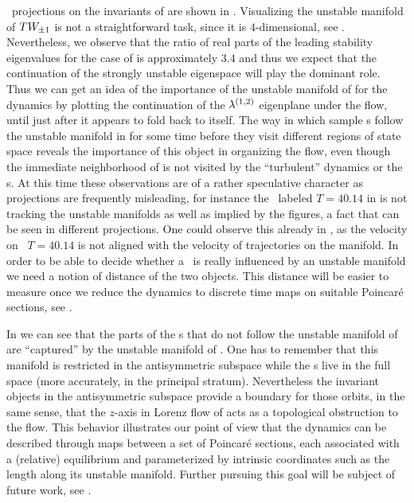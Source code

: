 \Statesp\ projections on the invariants of  are shown in
.
Visualizing the unstable manifold of $TW_{\pm1}$ is not a
straightforward task, since it is $4$-dimensional, see .
Nevertheless, we observe that the ratio of real parts of the leading stability eigenvalues for the case of  is approximately $3.4$ and thus we expect that the continuation of the strongly
unstable eigenspace will play the dominant role. Thus we can get an idea of the importance
of the unstable manifold of  for the dynamics
by plotting the continuation of the $\eigExp[1,2]$ eigenplane under the flow,
until just after it appears to fold back to itself.
The way
in which sample {\rpo s} follow the unstable manifold in
 for some time before they visit different
regions of state space reveals the importance of this object
in organizing the flow, even though the immediate neighborhood of
 is not visited by the ``turbulent'' dynamics or
the \rpo s.
At this time these observations are
of a rather speculative character as projections
are frequently misleading,
for instance the \rpo\ labeled $T=40.14$ in
 is not tracking the unstable manifolds as
well as implied by the figures, a fact that can be seen in
different projections. One could observe this already in
, as the velocity on \rpo\ $T=40.14$ is
not aligned with the velocity of trajectories on the
manifold. In order to be able to decide whether a \rpo\ is
really influenced by an unstable manifold we need a notion of
distance of the two objects. This distance will be easier to measure
once we reduce the dynamics to discrete time maps on
suitable Poincar\'e sections, see .

In  we can see that the parts of
the {\rpo s} that do not follow the unstable manifold of
 are ``captured'' by the unstable manifold of
. One has to remember that this manifold is restricted
in the antisymmetric subspace while the {\rpo s} live in the
full space (more accurately, in the principal stratum).
Nevertheless the invariant objects in the antisymmetric
subspace provide a boundary for those orbits, in the same
 sense, that the $z$-axis in Lorenz flow
 of  acts as a topological
obstruction to the flow. This behavior illustrates our point
of view that the dynamics can be described through maps
between a set of Poincar\'e sections, each associated with a
(relative) equilibrium and parameterized by intrinsic
coordinates such as the length along its unstable manifold.
Further pursuing this goal will be subject of future work,
see .


